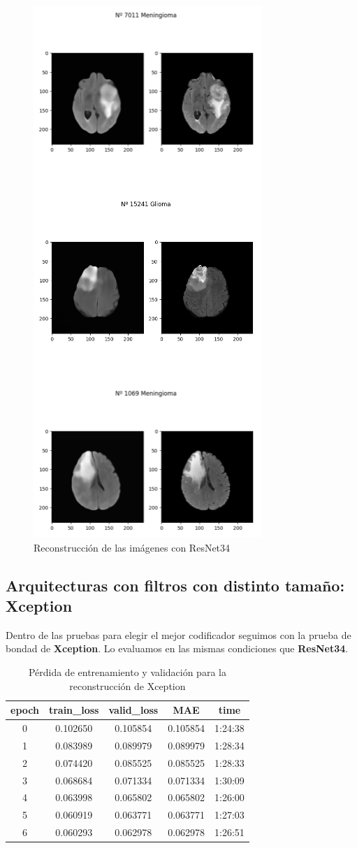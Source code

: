 \begin{figure}[H]
	\centering
	\includegraphics[width=0.4\linewidth]{imagenes/reconstruccion_resnet34.png}
	\caption{Reconstrucción de las imágenes con ResNet34}
\end{figure}

\subsection{Arquitecturas con filtros con distinto tamaño: Xception}

Dentro de las pruebas para elegir el mejor codificador seguimos con la prueba de bondad de \textbf{Xception}. Lo evaluamos en las mismas condiciones que \textbf{ResNet34}.

\begin{table}[H]
	\centering
	\begin{tabular}{|ccccc|}
		\toprule
		epoch & train\_loss & valid\_loss & MAE & time \\ 
		\midrule
		0 & 0.102650 & 0.105854 & 0.105854 & 1:24:38 \\ 
		1 & 0.083989 & 0.089979 & 0.089979 & 1:28:34 \\ 
		2 & 0.074420 & 0.085525 & 0.085525 & 1:28:33 \\ 
		3 & 0.068684 & 0.071334 & 0.071334 & 1:30:09 \\ 
		4 & 0.063998 & 0.065802 & 0.065802 & 1:26:00 \\ 
		5 & 0.060919 & 0.063771 & 0.063771 & 1:27:03 \\ 
		6 & 0.060293 & 0.062978 & 0.062978 & 1:26:51 \\ 
		\bottomrule
	\end{tabular}
	\caption{Pérdida de entrenamiento y validación para la reconstrucción de Xception}
	\label{tabla:resultados}
\end{table}

